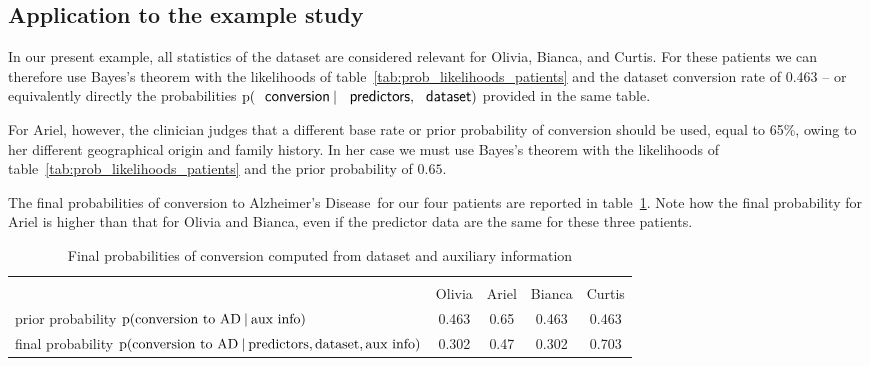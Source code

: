 \documentclass[utf8]{FrontiersinHarvard} %
\newcommand*{\p}{\mathrm{p}}%
\renewcommand*{\|}[1][]{\nonscript\:#1\vert\nonscript\:\mathopen{}}
\newcommand*{\ad}{Alzheimer's Disease}
\newcommand*{\mci}{Mild Cognitive Impairment}
\begin{document}


\subsection{Application to the example study}
\label{sec:posterior_application}

In our present example, all statistics of the dataset are considered relevant for Olivia, Bianca, and Curtis. For these patients we can therefore use Bayes's theorem with the likelihoods of table~\ref{tab:prob_likelihoods_patients} and the dataset conversion rate of $0.463$ -- or equivalently directly the probabilities $\p(\textsf{\small conversion} \| \textsf{\small predictors}, \textsf{\small dataset})$ provided in the same table.

For Ariel, however, the clinician judges that a different base rate or prior probability of conversion should be used, equal to 65\%,  owing to her different geographical origin and family history. In her case we must use Bayes's theorem with the likelihoods of table~\ref{tab:prob_likelihoods_patients} and the prior probability of $0.65$.

The final probabilities of conversion to \ad\ for our four patients are reported in table~\ref{tab:posterior_patients}. Note how the final probability for Ariel is higher than that for Olivia and Bianca, even if the predictor data are the same for these three patients.

\medskip
\begin{table}[!h]
  \centering
  \begin{tabular}{lcccc}
    \hline\\[-1.5\jot]
    &{\small Olivia} &{\small Ariel} &{\small Bianca} &{\small Curtis}
    \\[\jot]
    {\small prior probability $\p(\text{conversion to AD} \| \text{aux info})$}&
    0.463&0.65&0.463&0.463
    \\
    {\small final probability $\p(\text{conversion to AD} \| \text{predictors}, \text{dataset}, \text{aux info})$}&
    0.302&0.47&0.302&0.703
    \\[\jot]
    \hline
  \end{tabular}
    \caption{Final probabilities of conversion computed from dataset and auxiliary information}\label{tab:posterior_patients}
\end{table}
\end{document}
